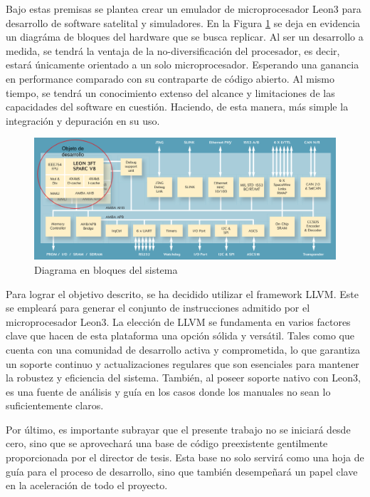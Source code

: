 Bajo estas premisas se plantea crear un emulador de microprocesador Leon3 para desarrollo de software satelital y simuladores. En la Figura \ref{fig:Components} se deja en evidencia un diagráma de bloques del hardware que se busca replicar. Al ser un desarrollo a medida, se tendrá la ventaja de la no-diversificación del procesador, es decir, estará únicamente orientado a un solo microprocesador. Esperando una ganancia en performance comparado con su contraparte de código abierto. Al mismo tiempo, se tendrá un conocimiento extenso del alcance y limitaciones de las capacidades del software en cuestión. Haciendo, de esta manera, más simple la integración y depuración en su uso.

\begin{figure}[htpb]
\centering
\includegraphics[width=1\textwidth]{./assets/Components.png}
\caption{Diagrama en bloques del sistema}
\label{fig:Components}
\end{figure}

\vspace{25px}

\newpage

Para lograr el objetivo descrito, se ha decidido utilizar el framework LLVM. Este se empleará para generar el conjunto de instrucciones admitido por el microprocesador Leon3. La elección de LLVM se fundamenta en varios factores clave que hacen de esta plataforma una opción sólida y versátil. Tales como que cuenta con una comunidad de desarrollo activa y comprometida, lo que garantiza un soporte continuo y actualizaciones regulares que son esenciales para mantener la robustez y eficiencia del sistema. También, al poseer soporte nativo con Leon3, es una fuente de análisis y guía en los casos donde los manuales no sean lo suficientemente claros.

Por último, es importante subrayar que el presente trabajo no se iniciará desde cero, sino que se aprovechará una base de código preexistente gentilmente proporcionada por el director de tesis. Esta base no solo servirá como una hoja de guía para el proceso de desarrollo, sino que también desempeñará un papel clave en la aceleración de todo el proyecto.

